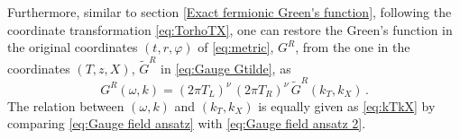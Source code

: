 \documentclass[11pt,a4paper]{article}
\begin{document}
 



Furthermore, similar to section \ref{Exact fermionic Green's function}, following the coordinate transformation \eqref{eq:TorhoTX}, one can restore the Green's function in the original coordinates $(t,r,\varphi)$ of \eqref{eq:metric}, $G^R$, from the one in the coordinates $(T,z,X)$, $\tilde{G}^R$ in \eqref{eq:Gauge Gtilde}, as
\begin{equation} \label{eq:relation of GR and GRt Gauge}
    G^R (\omega, k) = (2\pi T_L)^{\nu} \,(2\pi T_R)^{\nu} \,\tilde{G}^R(k_T, k_X)\,.
\end{equation}
The relation between $(\omega, k)$ and $(k_T, k_X)$ is equally given as \eqref{eq:kTkX} by comparing \eqref{eq:Gauge field ansatz} with \eqref{eq:Gauge field ansatz 2}.

\end{document}
